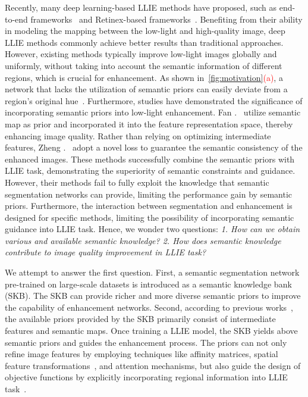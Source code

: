 \documentclass[10pt,twocolumn,letterpaper]{article}
\begin{document}
Recently, many  deep learning-based LLIE methods have proposed, such as end-to-end frameworks~\cite{moran2020deeplpf,yang2020drbn,xu2020learning,fan2022hwmnet,xu2022snr,dong2022abandoning} and Retinex-based frameworks~\cite{Chen2018Retinex,zhang2019kind,yang2021sparse,zhang2021kindplus,liu2021ruas,wu2022uretinexnet,wang2022llflow}. 
Benefiting from their ability in modeling the mapping between the low-light and high-quality image, deep LLIE methods commonly achieve better results than traditional approaches. However, existing methods typically improve low-light images globally and uniformly, without taking into account the semantic information of different regions, which is crucial for enhancement. As shown in~\cref{fig:motivation}\textcolor{red}{(a)}, a network that lacks the utilization of semantic priors can easily deviate from a region's original hue~\cite{li2021lliesurvey}. Furthermore, studies have demonstrated the significance of incorporating semantic priors into low-light enhancement. Fan \etal.~\cite{fan2020integrating} utilize semantic map as prior and incorporated it into the feature representation space, thereby enhancing image quality. Rather than relying on optimizing intermediate features, Zheng \etal.~\cite{zheng2022semanticzeroLLIE} adopt a novel loss to guarantee the semantic consistency of the enhanced images. These methods successfully combine the semantic priors with LLIE task, demonstrating the superiority of semantic constraints and guidance. However, their methods fail to fully exploit the knowledge that semantic segmentation networks can provide, limiting the performance gain by semantic priors. Furthermore, the interaction between segmentation and enhancement is designed for specific methods, limiting the possibility of incorporating semantic guidance into LLIE task. Hence, we wonder two questions: \textit{1. How can we obtain various and available semantic knowledge? 2. How does semantic knowledge contribute to image quality improvement in LLIE task?} 

We attempt to answer the first question.
First, a semantic segmentation network pre-trained on large-scale datasets is introduced as a semantic knowledge bank (SKB). The SKB can provide richer and more diverse semantic priors to improve the capability of enhancement networks. 
Second, according to previous works~\cite{fan2020integrating,zheng2022semanticzeroLLIE,jung2021semanticdepth1}, the available priors provided by the SKB primarily consist of intermediate features and semantic maps. Once training a LLIE model, the SKB yields above semantic priors and guides the enhancement process. The priors can not only refine image features by employing techniques like affinity matrices, spatial feature transformations~\cite{wang2018sft}, and attention mechanisms, but also guide the design of objective functions by explicitly incorporating regional information into LLIE task~\cite{liang2022SCLLLE}.
\end{document}
